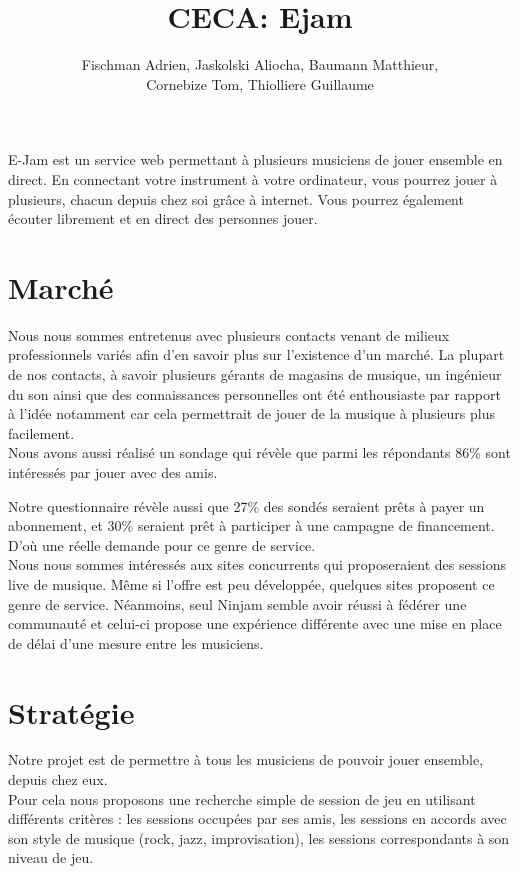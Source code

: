 \documentclass[a4,12pt]{article}
\title{CECA: Ejam}
\author{Fischman Adrien, Jaskolski Aliocha, Baumann Matthieur,\\ Cornebize Tom, Thiolliere Guillaume}
\begin{document}
\maketitle

E-Jam est un service web permettant à plusieurs musiciens de jouer ensemble en direct.
En connectant votre instrument à votre ordinateur, vous pourrez jouer à plusieurs,
chacun depuis chez soi grâce à internet.
Vous pourrez également écouter librement et en direct des personnes jouer.

\section{Marché}

Nous nous sommes entretenus avec plusieurs contacts venant de milieux professionnels
variés afin d’en savoir plus sur l’existence d’un marché.
La plupart de nos contacts, à savoir plusieurs gérants de magasins
de musique, un ingénieur du son ainsi que des connaissances personnelles ont été
enthousiaste par rapport à l'idée notamment car cela permettrait de jouer de la musique
à plusieurs plus facilement.
\\

Nous avons aussi réalisé un sondage qui révèle que parmi les répondants
86\% sont intéressés par jouer avec des amis.

Notre questionnaire révèle aussi que 27\% des sondés seraient prêts à payer un abonnement,
et 30\% seraient prêt à participer à une campagne de financement.
D'où une réelle demande pour ce genre de service.
\\

Nous nous sommes intéressés aux sites concurrents qui proposeraient des sessions
live de musique. Même si l’offre est peu développée, quelques sites proposent ce genre de service.
Néanmoins, seul Ninjam semble avoir réussi à fédérer une communauté et celui-ci propose une expérience
différente avec une mise en place de délai d'une mesure entre les musiciens.
\\

\section{Stratégie}

Notre projet est de permettre à tous les musiciens de pouvoir jouer ensemble,
depuis chez eux.
\\

Pour cela nous proposons une recherche simple de session de jeu en utilisant différents critères :
les sessions occupées par ses amis,
les sessions en accords avec son style de musique (rock, jazz, improvisation),
les sessions correspondants à son niveau de jeu.\\
\end{document}
